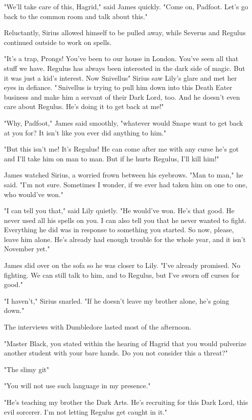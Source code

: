 "We'll take care of this, Hagrid," said James quickly. "Come on, Padfoot. Let's go back to the common room and talk about this."

Reluctantly, Sirius allowed himself to be pulled away, while Severus and Regulus continued outside to work on spells.

"It's a trap, Prongs! You've been to our house in London. You've seen all that stuff we have. Regulus has always been interested in the dark side of magic. But it was just a kid's interest. Now Snivellus{\el}" Sirius saw Lily's glare and met her eyes in defiance. "{\el}\,Snivellus is trying to pull him down into this Death Eater business and make him a servant of their Dark Lord, too. And he doesn't even care about Regulus. He's doing it to get back at me!"

"Why, Padfoot," James said smoothly, "whatever would Snape want to get back at you for? It isn't like you ever did anything to him."

"But this isn't me! It's Regulus! He can come after me with any curse he's got and I'll take him on man to man. But if he hurts Regulus, I'll kill him!"

James watched Sirius, a worried frown between his eyebrows. "Man to man," he said. "I'm not sure. Sometimes I wonder, if we ever had taken him on one to one, who would've won."

"I can tell you that," said Lily quietly. "He would've won. He's that good. He never used all his spells on you. I can also tell you that he never wanted to fight. Everything he did was in response to something you started. So now, please, leave him alone. He's already had enough trouble for the whole year, and it isn't November yet."

James slid over on the sofa so he was closer to Lily. "I've already promised. No fighting. We can still talk to him, and to Regulus, but I've sworn off curses for good."

"I haven't," Sirius snarled. "If he doesn't leave my brother alone, he's going down."

The interviews with Dumbledore lasted most of the afternoon.

"Master Black, you stated within the hearing of Hagrid that you would pulverize another student with your bare hands. Do you not consider this a threat?"

"The slimy git{\el}"

"You will not use such language in my presence."

"He's teaching my brother the Dark Arts. He's recruiting for this Dark Lord, this evil sorcerer. I'm not letting Regulus get caught in it."

